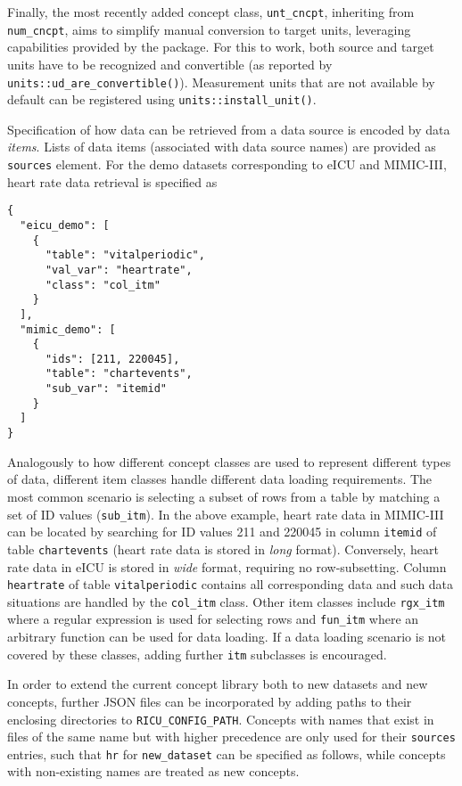 \documentclass[
  notitle,
  nojss,
  noheadings]{jss}
\begin{document}
Finally, the most recently added concept class, \texttt{unt\_cncpt},
inheriting from \texttt{num\_cncpt}, aims to simplify manual conversion
to target units, leveraging capabilities provided by the 
package. For this to work, both source and target units have to be
recognized and convertible (as reported by
\texttt{units::ud\_are\_convertible()}). Measurement units that are not
available by default can be registered using
\texttt{units::install\_unit()}.

Specification of how data can be retrieved from a data source is encoded
by data \emph{items}. Lists of data items (associated with data source
names) are provided as \texttt{sources} element. For the demo datasets
corresponding to eICU and MIMIC-III, heart rate data retrieval is
specified as

\begin{verbatim}
{
  "eicu_demo": [
    {
      "table": "vitalperiodic",
      "val_var": "heartrate",
      "class": "col_itm"
    }
  ],
  "mimic_demo": [
    {
      "ids": [211, 220045],
      "table": "chartevents",
      "sub_var": "itemid"
    }
  ]
}
\end{verbatim}

Analogously to how different concept classes are used to represent
different types of data, different item classes handle different data
loading requirements. The most common scenario is selecting a subset of
rows from a table by matching a set of ID values (\texttt{sub\_itm}). In
the above example, heart rate data in MIMIC-III can be located by
searching for ID values 211 and 220045 in column \texttt{itemid} of
table \texttt{chartevents} (heart rate data is stored in \emph{long}
format). Conversely, heart rate data in eICU is stored in \emph{wide}
format, requiring no row-subsetting. Column \texttt{heartrate} of table
\texttt{vitalperiodic} contains all corresponding data and such data
situations are handled by the \texttt{col\_itm} class. Other item
classes include \texttt{rgx\_itm} where a regular expression is used for
selecting rows and \texttt{fun\_itm} where an arbitrary function can be
used for data loading. If a data loading scenario is not covered by
these classes, adding further \texttt{itm} subclasses is encouraged.

In order to extend the current concept library both to new datasets and
new concepts, further JSON files can be incorporated by adding paths to
their enclosing directories to \texttt{RICU\_CONFIG\_PATH}. Concepts
with names that exist in files of the same name but with higher
precedence are only used for their \texttt{sources} entries, such that
\texttt{hr} for \texttt{new\_dataset} can be specified as follows, while
concepts with non-existing names are treated as new concepts.
\end{document}
